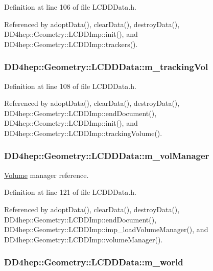 Definition at line 106 of file LCDDData.h.

Referenced by adoptData(), clearData(), destroyData(), DD4hep::Geometry::LCDDImp::init(), and DD4hep::Geometry::LCDDImp::trackers().\hypertarget{class_d_d4hep_1_1_geometry_1_1_l_c_d_d_data_a05d9a2147427574904e80936b009d5ec}{
\subsubsection[{m\_\-trackingVol}]{ {\bf DD4hep::Geometry::LCDDData::m\_\-trackingVol}}}
\label{class_d_d4hep_1_1_geometry_1_1_l_c_d_d_data_a05d9a2147427574904e80936b009d5ec}


Definition at line 108 of file LCDDData.h.

Referenced by adoptData(), clearData(), destroyData(), DD4hep::Geometry::LCDDImp::endDocument(), DD4hep::Geometry::LCDDImp::init(), and DD4hep::Geometry::LCDDImp::trackingVolume().\hypertarget{class_d_d4hep_1_1_geometry_1_1_l_c_d_d_data_a8a01d0ac487c537e9826d2900c95062a}{
\subsubsection[{m\_\-volManager}]{ {\bf DD4hep::Geometry::LCDDData::m\_\-volManager}}}
\label{class_d_d4hep_1_1_geometry_1_1_l_c_d_d_data_a8a01d0ac487c537e9826d2900c95062a}


\hyperlink{class_d_d4hep_1_1_geometry_1_1_volume}{Volume} manager reference. 

Definition at line 121 of file LCDDData.h.

Referenced by adoptData(), clearData(), destroyData(), DD4hep::Geometry::LCDDImp::endDocument(), DD4hep::Geometry::LCDDImp::imp\_\-loadVolumeManager(), and DD4hep::Geometry::LCDDImp::volumeManager().\hypertarget{class_d_d4hep_1_1_geometry_1_1_l_c_d_d_data_a3ef048ff40cb10d7321edb4e128319c4}{
\subsubsection[{m\_\-world}]{ {\bf DD4hep::Geometry::LCDDData::m\_\-world}}}
\label{class_d_d4hep_1_1_geometry_1_1_l_c_d_d_data_a3ef048ff40cb10d7321edb4e128319c4}


